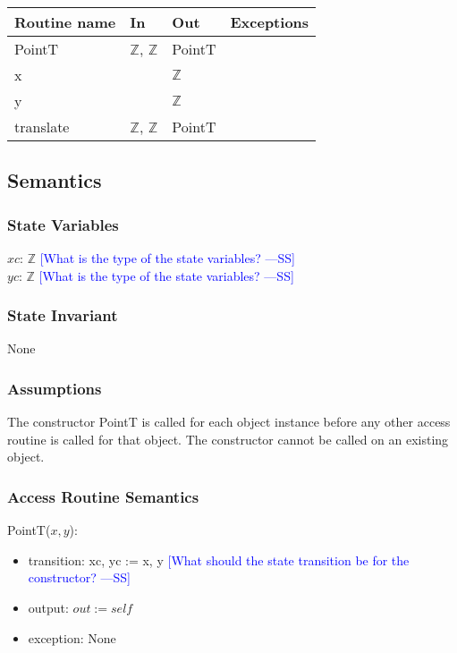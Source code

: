 \documentclass[12pt]{article}
\newcommand{\authornote}[3]{\textcolor{#1}{[#3 ---#2]}}
\newcommand{\authornote}[3]{}
\newcommand{\wss}[1]{\authornote{blue}{SS}{#1}}
\begin{document}
\begin{tabular}{| l | l | l | l |}
\hline
\textbf{Routine name} & \textbf{In} & \textbf{Out} & \textbf{Exceptions}\\
\hline
PointT & $\mathbb{Z}$, $\mathbb{Z}$ & PointT & \\
\hline
x & ~ & $\mathbb{Z}$ & ~\\
\hline
y & ~ & $\mathbb{Z}$ & ~\\
\hline
translate & $\mathbb{Z}$, $\mathbb{Z}$ & PointT & ~\\
\hline
\end{tabular}

\subsection* {Semantics}

\subsubsection* {State Variables}

$xc$: $\mathbb{Z}$ \wss{What is the type of the state variables?}\\
$yc$: $\mathbb{Z}$ \wss{What is the type of the state variables?}

\subsubsection* {State Invariant}

None

\subsubsection* {Assumptions}

The constructor PointT is called for each object instance before any other
access routine is called for that object.  The constructor cannot be called on
an existing object.

\subsubsection* {Access Routine Semantics}

PointT($x, y$):
\begin{itemize}
\item transition: xc, yc := x, y \wss{What should the state transition be for the constructor?}
\item output: $out := \mathit{self}$
\item exception: None
\end{itemize}
\end{document}

